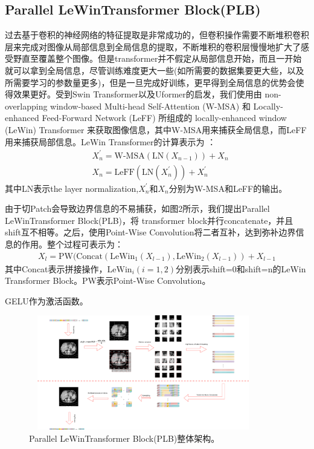 \subsection{Parallel LeWinTransformer Block(PLB)}
过去基于卷积的神经网络的特征提取是非常成功的，但卷积操作需要不断堆积卷积层来完成对图像从局部信息到全局信息的提取，不断堆积的卷积层慢慢地扩大了感受野直至覆盖整个图像。但是transformer并不假定从局部信息开始，而且一开始就可以拿到全局信息，尽管训练难度更大一些(如所需要的数据集要更大些，以及所需要学习的参数量更多)，但是一旦完成好训练，更早得到全局信息的优势会使得效果更好。受到Swin Transformer\cite{liu2021Swin}以及Uformer\cite{wang2021uformer}的启发，我们使用由 non-overlapping window-based Multi-head Self-Attention (W-MSA) 和 Locally-enhanced Feed-Forward Network (LeFF) 所组成的 locally-enhanced window (LeWin) Transformer 来获取图像信息，其中W-MSA用来捕获全局信息，而LeFF用来捕获局部信息。LeWin Transformer的计算表示为
：
\begin{equation}\begin{aligned}&X^{'}_{n} = \mathrm{W\mbox{-}MSA}(\mathrm{LN}(X_{n-1}))+X_{n}   \\&X_{n} = \mathrm{LeFF}(\mathrm{LN}(X^{'}_{n}))+X^{'}_{n}\end{aligned}\end{equation}
其中LN表示the layer normalization,$X^{'}_{n}$和$X_{n}$分别为W-MSA和LeFF的输出。\par

由于切Patch会导致边界信息的不易捕获，如图2所示，我们提出Parallel LeWinTransformer Block(PLB)，将 transformer block并行concatenate，并且shift互不相等。之后，使用Point-Wise Convolution\cite{2017Xception}将二者互补，达到弥补边界信息的作用。整个过程可表示为：
\begin{equation}\begin{aligned}X_{l} = \mathrm{PW}(\mathrm{Concat}(\mathrm{LeWin_1}(X_{l-1}),\mathrm{LeWin_2}(X_{l-1}))+X_{l-1} \end{aligned}\end{equation}其中Concat表示拼接操作，$\mathrm{LeWin}_i(i=1,2)$分别表示shift=0和shift=n的LeWin Transformer Block。PW表示Point-Wise Convolution。\par GELU\cite{hendrycks2016gelu}作为激活函数。
\begin{figure}
	\centering
	\includegraphics[height=5cm,width=10cm]{5.eps}
	\caption{Parallel LeWinTransformer Block(PLB)整体架构。}
	\label{fig2}
\end{figure}

